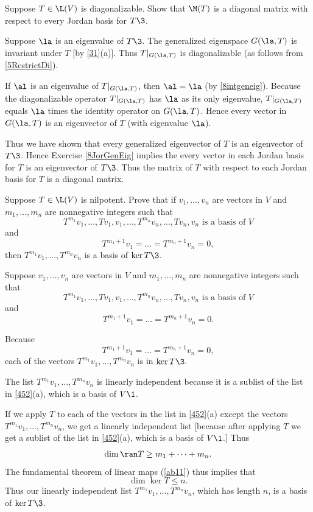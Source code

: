 \exercise
Suppose $T \in \L(V)$ is diagonalizable. Show that $\M(T)$ is a diagonal matrix with respect to every Jordan basis for $T\3$.

\begin{Solution}
Suppose $\la$ is an eigenvalue of $T\3$. The generalized eigenspace $G(\la, T)$ is invariant under $T$ [by \ref{31}(a)]. Thus
$T|_{G(\la, T)}$ is diagonalizable (as follows from \ref{5RestrictDi}).

If $\al$ is an eigenvalue of $T|_{G(\la, T)}$, then $\al = \la$ (by \ref{8intgeneig}). Because the diagonalizable operator $T|_{G(\la, T)}$ has $\la$ as its only eigenvalue, $T|_{G(\la, T)}$ equals $\la$ times the identity operator on $G(\la, T)$. Hence every vector in $G(\la, T)$ is an eigenvector of $T$ (with eigenvalue $\la$).

Thus we have shown that every generalized eigenvector of $T$ is an eigenvector of $T\3$. Hence Exercise \ref{8JorGenEig} implies the every vector in each Jordan basis for $T$ is an eigenvector of $T\3$. Thus the matrix of $T$ with respect to each Jordan basis for $T$ is a diagonal matrix.
\end{Solution}

\exercise
Suppose $T \in \L(V)$ is nilpotent. Prove that if $v_1, \dots, v_n$ are vectors in $V$ and $m_1, \dots, m_n$ are nonnegative integers such that
\[
T^{m_1}v_1, \dots, Tv_1, v_1, \dots, T^{m_n}v_n, \dots, Tv_n, v_n \text{ is a basis of } V
\]
and
\[
T^{m_1 + 1} v_1 = \dots = T^{m_n + 1} v_n = 0,
\]
then $T^{m_1}v_1, \dots, T^{m_n}v_n$ is a basis of $\ker T\3$.

\begin{Solution}
Suppose $v_1, \dots, v_n$ are vectors in $V$ and $m_1, \dots, m_n$ are nonnegative integers such that
\[
T^{m_1}v_1, \dots, Tv_1, v_1, \dots, T^{m_n}v_n, \dots, Tv_n, v_n \text{ is a basis of } V
\]
and
\[
T^{m_1 + 1} v_1 = \dots = T^{m_n + 1} v_n = 0.
\]

Because
\[
T^{m_1 + 1} v_1 = \dots = T^{m_n + 1} v_n = 0,
\]
each of the vectors $T^{m_1}v_1, \dots, T^{m_n}v_n$ is in $\ker T\3$.

The list
$T^{m_1}v_1, \dots, T^{m_n}v_n$ is linearly independent because it is a sublist of the list in \ref{452}(a), which is a basis of $V\1$.

If we apply $T$ to each of the vectors in the list in \ref{452}(a) except the vectors $T^{m_1}v_1, \dots, T^{m_n}v_n$, we get a linearly independent list [because after applying $T$ we get a sublist of the list in \ref{452}(a), which is a basis of $V\1$.] Thus
\[
\dim \ran T \ge m_1 + \dots + m_n.
\]
The fundamental theorem of linear maps (\ref{ab11}) thus implies that
\[
\dim \ker T \le n.
\]
Thus our linearly independent list $T^{m_1}v_1, \dots, T^{m_n}v_n$, which has length $n$, is a basis of $\ker T\3$.
\end{Solution}

